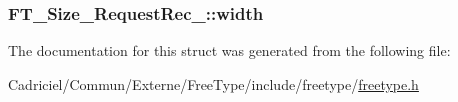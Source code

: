 \hypertarget{struct_f_t___size___request_rec___a7b044d36af318b053d5e3939eb0d5039}{
\subsubsection[{width}]{ F\-T\-\_\-\-Size\-\_\-\-Request\-Rec\-\_\-\-::width}}\label{struct_f_t___size___request_rec___a7b044d36af318b053d5e3939eb0d5039}


The documentation for this struct was generated from the following file\-:\begin{DoxyCompactItemize}
\item 
Cadriciel/\-Commun/\-Externe/\-Free\-Type/include/freetype/\hyperlink{freetype_8h}{freetype.\-h}\end{DoxyCompactItemize}
